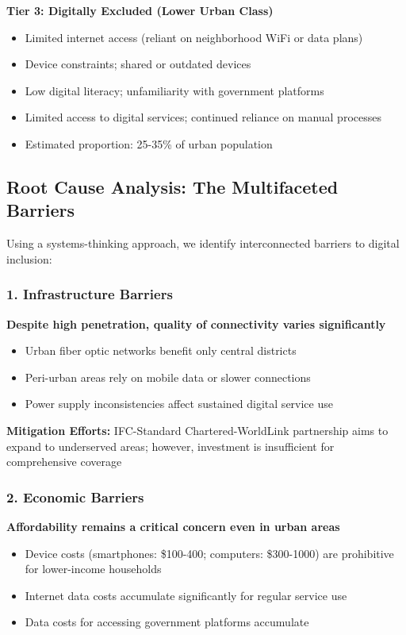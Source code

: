 \documentclass[12pt,a4paper]{article}
\begin{document}
\vspace{6pt}
\noindent\textbf{Tier 3: Digitally Excluded (Lower Urban Class)}
\begin{itemize}[leftmargin=1.5em]
    \item Limited internet access (reliant on neighborhood WiFi or data plans)
    \item Device constraints; shared or outdated devices
    \item Low digital literacy; unfamiliarity with government platforms
    \item Limited access to digital services; continued reliance on manual processes
    \item Estimated proportion: 25-35\% of urban population
\end{itemize}

\subsection{Root Cause Analysis: The Multifaceted Barriers}

Using a systems-thinking approach, we identify interconnected barriers to digital inclusion:

\subsubsection{1. Infrastructure Barriers}

\textbf{Despite high penetration, quality of connectivity varies significantly}
\begin{itemize}
    \item Urban fiber optic networks benefit only central districts
    \item Peri-urban areas rely on mobile data or slower connections
    \item Power supply inconsistencies affect sustained digital service use
\end{itemize}

\textbf{Mitigation Efforts:} IFC-Standard Chartered-WorldLink partnership aims to expand to underserved areas; however, investment is insufficient for comprehensive coverage

\subsubsection{2. Economic Barriers}

\textbf{Affordability remains a critical concern even in urban areas}
\begin{itemize}
    \item Device costs (smartphones: \$100-400; computers: \$300-1000) are prohibitive for lower-income households
    \item Internet data costs accumulate significantly for regular service use
    \item Data costs for accessing government platforms accumulate
\end{itemize}
\end{document}
